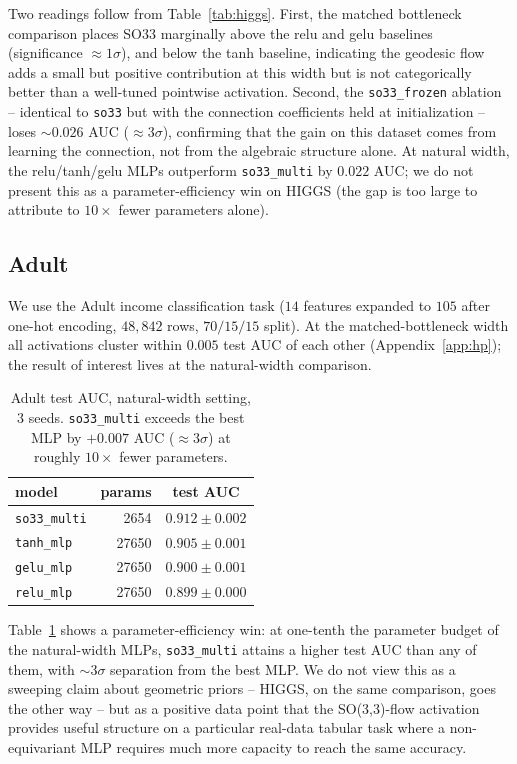 \documentclass[11pt]{article}
\begin{document}
Two readings follow from Table~\ref{tab:higgs}. First, the matched
bottleneck comparison places SO33 marginally above the relu and gelu
baselines (significance $\approx 1\sigma$), and below the tanh
baseline, indicating the geodesic flow adds a small but positive
contribution at this width but is not categorically better than a
well-tuned pointwise activation. Second, the \texttt{so33\_frozen}
ablation -- identical to \texttt{so33} but with the connection
coefficients held at initialization -- loses $\sim 0.026$ AUC
($\approx 3\sigma$), confirming that the gain on this dataset comes
from learning the connection, not from the algebraic structure alone.
At natural width, the relu/tanh/gelu MLPs outperform
\texttt{so33\_multi} by $0.022$ AUC; we do not present this as a
parameter-efficiency win on HIGGS (the gap is too large to attribute to
$10\times$ fewer parameters alone).

\subsection{Adult}
\label{sec:exp-adult}

We use the Adult income classification task ($14$ features expanded to
$105$ after one-hot encoding, $48{,}842$ rows, $70/15/15$ split). At the
matched-bottleneck width all activations cluster within $0.005$ test
AUC of each other (Appendix~\ref{app:hp}); the result of interest lives
at the natural-width comparison.

\begin{table}[t]
  \centering
  \caption{Adult test AUC, natural-width setting, $3$ seeds.
    \texttt{so33\_multi} exceeds the best MLP by $+0.007$ AUC
    ($\approx 3\sigma$) at roughly $10\times$ fewer parameters.}
  \label{tab:adult}
  \begin{tabular}{lrc}
    \toprule
    model & params & test AUC \\
    \midrule
    \texttt{so33\_multi}          & 2654  & $\mathbf{0.912\pm 0.002}$ \\
    \texttt{tanh\_mlp}            & 27650 & $0.905\pm 0.001$ \\
    \texttt{gelu\_mlp}            & 27650 & $0.900\pm 0.001$ \\
    \texttt{relu\_mlp}            & 27650 & $0.899\pm 0.000$ \\
    \bottomrule
  \end{tabular}
\end{table}

Table~\ref{tab:adult} shows a parameter-efficiency win: at one-tenth
the parameter budget of the natural-width MLPs, \texttt{so33\_multi}
attains a higher test AUC than any of them, with $\sim 3\sigma$
separation from the best MLP. We do not view this as a sweeping claim
about geometric priors -- HIGGS, on the same comparison, goes the
other way -- but as a positive data point that the SO(3,3)-flow
activation provides useful structure on a particular real-data tabular
task where a non-equivariant MLP requires much more capacity to reach
the same accuracy.
\end{document}
